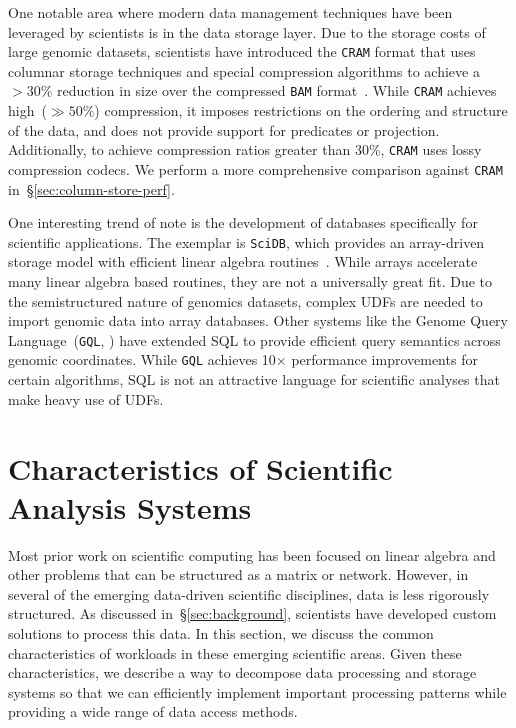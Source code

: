 \documentclass{sig-alternate}
\begin{document}
One notable area where modern data management techniques have been leveraged by scientists is in
the data storage layer. Due to the storage costs of large genomic datasets, scientists have introduced the
\texttt{CRAM} format that uses columnar storage techniques and special compression algorithms to achieve a
$>30$\% reduction in size over the compressed \texttt{BAM} format~\cite{fritz11}. While \texttt{CRAM} achieves
high~($\gg 50\%$) compression, it imposes restrictions on the ordering and structure of the data, and does not provide
support for predicates or projection. Additionally, to achieve compression ratios greater than 30\%, \texttt{CRAM} uses
lossy compression codecs. We perform a more comprehensive comparison against \texttt{CRAM}
in~\S\ref{sec:column-store-perf}.

One interesting trend of note is the development of \linebreak databases specifically for scientific applications.
The exemplar is \texttt{SciDB}, which provides an array-driven storage model with efficient
linear algebra routines~\cite{brown10}. While arrays accelerate many linear algebra based routines, they
are not a universally great fit. Due to the semistructured nature of genomics datasets, complex UDFs are needed
to import genomic data into array databases. Other systems like the Genome Query Language~(\texttt{GQL},
\cite{kozanitis14}) have extended SQL to provide efficient query semantics across
genomic coordinates. While \texttt{GQL} achieves 10$\times$ performance improvements for certain
algorithms, SQL is not an attractive language for scientific analyses that make heavy use of UDFs.

\section{Characteristics of Scientific \\ Analysis Systems}
\label{sec:principles}

Most prior work on scientific computing has been focused on linear algebra and other problems that can
be structured as a matrix or network. However, in several of the emerging data-driven scientific
disciplines, data is less rigorously structured. As discussed in~\S\ref{sec:background}, scientists have
developed custom solutions to process this data. In this
section, we discuss the common characteristics of workloads in these emerging scientific areas. Given
these characteristics, we describe a way to decompose data processing and storage systems so that
we can efficiently implement important processing patterns while providing a wide range of data access
methods.
\end{document}
